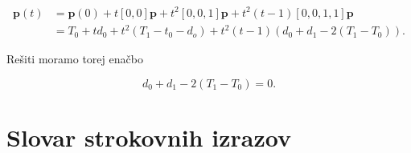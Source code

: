 \documentclass[mat1]{fmfdelo}
\begin{document}
\begin{align*}
\textbf{p}(t) &= \textbf{p}(0) + t [0,0]\textbf{p} + t^2[0,0,1]\textbf{p} + t^2(t - 1)[0,0,1,1]\textbf{p} \\
	&= T_0 + t d_0 + t^2(T_1 - t_0 - d_o) + t^2(t - 1)(d_0 + d_1 - 2(T_1 - T_0))
.\end{align*}

Rešiti moramo torej enačbo

\begin{equation}
d_0 + d_1 - 2(T_1 - T_0) = 0
.\end{equation}


\section*{Slovar strokovnih izrazov}

\geslo{}{}
\geslo{}{}


\begin{thebibliography}{99}


\end{thebibliography}
\end{document}
